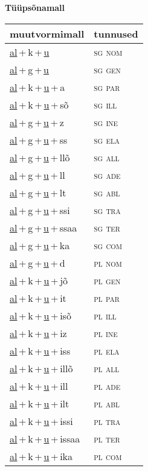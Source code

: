 
\vspace{1.8em}
\begin{minipage}{\textwidth}
\textbf{Tüüpsõnamall \,}\\

\begin{sideways}
\begin{tabular}{l l}
muutvormimall & tunnused \\
\hline
\underline{al}\,+\,k\,+\,\underline{u} & \textsc{ sg nom } \\
\underline{al}\,+\,g\,+\,\underline{u} & \textsc{ sg gen } \\
\underline{al}\,+\,k\,+\,\underline{u}\,+\,a & \textsc{ sg par } \\
\underline{al}\,+\,k\,+\,\underline{u}\,+\,sõ & \textsc{ sg ill } \\
\underline{al}\,+\,g\,+\,\underline{u}\,+\,z & \textsc{ sg ine } \\
\underline{al}\,+\,g\,+\,\underline{u}\,+\,ss & \textsc{ sg ela } \\
\underline{al}\,+\,g\,+\,\underline{u}\,+\,llõ & \textsc{ sg all } \\
\underline{al}\,+\,g\,+\,\underline{u}\,+\,ll & \textsc{ sg ade } \\
\underline{al}\,+\,g\,+\,\underline{u}\,+\,lt & \textsc{ sg abl } \\
\underline{al}\,+\,g\,+\,\underline{u}\,+\,ssi & \textsc{ sg tra } \\
\underline{al}\,+\,g\,+\,\underline{u}\,+\,ssaa & \textsc{ sg ter } \\
\underline{al}\,+\,g\,+\,\underline{u}\,+\,ka & \textsc{ sg com } \\
\underline{al}\,+\,g\,+\,\underline{u}\,+\,d & \textsc{ pl nom } \\
\underline{al}\,+\,k\,+\,\underline{u}\,+\,jõ & \textsc{ pl gen } \\
\underline{al}\,+\,k\,+\,\underline{u}\,+\,it & \textsc{ pl par } \\
\underline{al}\,+\,k\,+\,\underline{u}\,+\,isõ & \textsc{ pl ill } \\
\underline{al}\,+\,k\,+\,\underline{u}\,+\,iz & \textsc{ pl ine } \\
\underline{al}\,+\,k\,+\,\underline{u}\,+\,iss & \textsc{ pl ela } \\
\underline{al}\,+\,k\,+\,\underline{u}\,+\,illõ & \textsc{ pl all } \\
\underline{al}\,+\,k\,+\,\underline{u}\,+\,ill & \textsc{ pl ade } \\
\underline{al}\,+\,k\,+\,\underline{u}\,+\,ilt & \textsc{ pl abl } \\
\underline{al}\,+\,k\,+\,\underline{u}\,+\,issi & \textsc{ pl tra } \\
\underline{al}\,+\,k\,+\,\underline{u}\,+\,issaa & \textsc{ pl ter } \\
\underline{al}\,+\,k\,+\,\underline{u}\,+\,ika & \textsc{ pl com } \\
\end{tabular}
\end{sideways}
\label{tab:tüüpsõnamall-alku}


\end{minipage}

